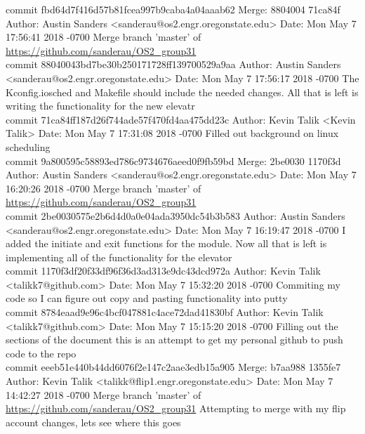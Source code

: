 \documentclass[onecolumn, draftclsnofoot,10pt, compsoc]{IEEEtran}
\begin{document}
{commit fbd64d7f416d57b81fcea997b9caba4a04aaab62
Merge: 8804004 71ca84f
Author: Austin Sanders <sanderau@os2.engr.oregonstate.edu>
Date:   Mon May 7 17:56:41 2018 -0700
Merge branch 'master' of \url{https://github.com/sanderau/OS2_group31}\\

commit 88040043bd7be30b250171728ff139700529a9aa
Author: Austin Sanders <sanderau@os2.engr.oregonstate.edu>
Date:   Mon May 7 17:56:17 2018 -0700
The Kconfig.iosched and Makefile should include the needed changes. All that is left is writing the functionality for the new elevatr\\

commit 71ca84ff187d26f744ade57f470fd4aa475dd23c
Author: Kevin Talik <Kevin Talik>
Date:   Mon May 7 17:31:08 2018 -0700
Filled out background on linux scheduling\\

commit 9a800595c58893ed786c9734676aeed0f9fb59bd
Merge: 2be0030 1170f3d
Author: Austin Sanders <sanderau@os2.engr.oregonstate.edu>
Date:   Mon May 7 16:20:26 2018 -0700
Merge branch 'master' of \url{https://github.com/sanderau/OS2_group31}\\

commit 2be0030575e2b6d4d0a0e04ada3950dc54b3b583
Author: Austin Sanders <sanderau@os2.engr.oregonstate.edu>
Date:   Mon May 7 16:19:47 2018 -0700
I added the initiate and exit functions for the module. Now all that is left is implementing all of the functionality for the elevator \\

commit 1170f3df20f33df96f36d3ad313e9dc43dcd972a
Author: Kevin Talik <talikk7@github.com>
Date:   Mon May 7 15:32:20 2018 -0700
Commiting my code so I can figure out copy and pasting functionality into putty\\

commit 8784eaad9e96c4bcf047881c4ace72dad41830bf
Author: Kevin Talik <talikk7@github.com>
Date:   Mon May 7 15:15:20 2018 -0700
Filling out the sections of the document
this is an attempt to get my personal github to push code to the repo\\

commit eeeb51e440b44dd6076f2e147c2aae3edb15a905
Merge: b7aa988 1355fe7
Author: Kevin Talik <talikk@flip1.engr.oregonstate.edu>
Date:   Mon May 7 14:42:27 2018 -0700
Merge branch 'master' of \url{https://github.com/sanderau/OS2_group31}
Attempting to merge with my flip account changes, lets see where this goes\\

}
\end{document}
